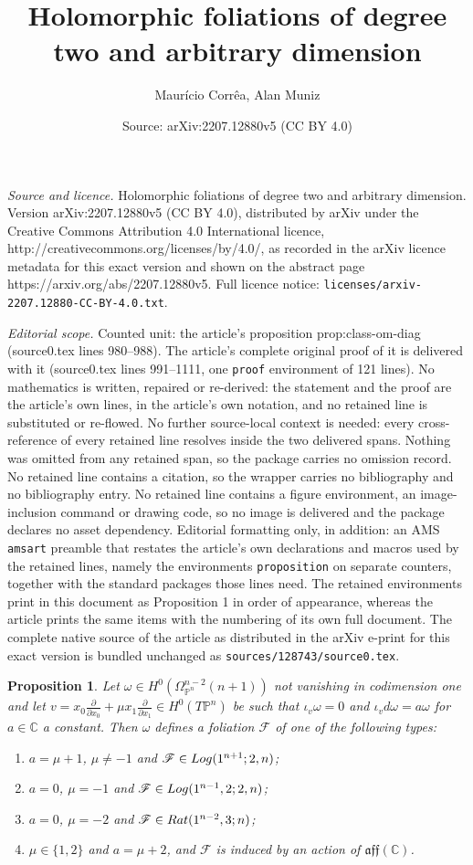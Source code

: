 \documentclass[10pt,a4paper]{amsart}
\title{Holomorphic foliations of degree two and arbitrary dimension}
\author{Maur\'icio Corr\^ea, Alan Muniz}
\date{Source: arXiv:2207.12880v5 (CC BY 4.0)}
\newtheorem{proposition}{Proposition}
\def\CC{{\mathbb{C}}}
\newcommand{\del}[1]{\frac{\partial}{\partial #1}}
\newcommand{\logg}[3]{{\rm Log}(#1;#2,#3)}
\newcommand{\mf}[1]{\mathfrak{#1}}
\newcommand{\pn}{{\mathbb{P}^{n}}}
\newcommand{\rat}[2]{{\rm Rat}(#1;#2)}
\newcommand{\sF}{\mathscr{F}}
\newcommand{\tpn}{T{\mathbb{P}^{n}}}
\begin{document}
\maketitle

\noindent\emph{Source and licence.} Holomorphic foliations of degree two and arbitrary dimension. Version arXiv:2207.12880v5 (CC BY 4.0), distributed by arXiv under the Creative Commons Attribution 4.0 International licence, http://creativecommons.org/licenses/by/4.0/, as recorded in the arXiv licence metadata for this exact version and shown on the abstract page https://arxiv.org/abs/2207.12880v5. Full licence notice: \texttt{licenses/arxiv-2207.12880-CC-BY-4.0.txt}.\par\smallskip

\noindent\textit{Editorial scope.} Counted unit: the article's proposition prop:class-om-diag (source0.tex lines 980--988). The article's complete original proof of it is delivered with it (source0.tex lines 991--1111, one \texttt{proof} environment of 121 lines). No mathematics is written, repaired or re-derived: the statement and the proof are the article's own lines, in the article's own notation, and no retained line is substituted or re-flowed.  No further source-local context is needed: every cross-reference of every retained line resolves inside the two delivered spans.  Nothing was omitted from any retained span, so the package carries no omission record.  No retained line contains a citation, so the wrapper carries no bibliography and no bibliography entry.  No retained line contains a figure environment, an image-inclusion command or drawing code, so no image is delivered and the package declares no asset dependency.  Editorial formatting only, in addition: an AMS \texttt{amsart} preamble that restates the article's own declarations and macros used by the retained lines, namely the environments \texttt{proposition} on separate counters, together with the standard packages those lines need.  The retained environments print in this document as Proposition 1 in order of appearance, whereas the article prints the same items with the numbering of its own full document.  The complete native source of the article as distributed in the arXiv e-print for this exact version is bundled unchanged as \texttt{sources/128743/source0.tex}.
\begin{proposition}\label{prop:class-om-diag}
 Let $\omega\in H^0(\Omega_{\pn}^{n-2}(n+1))$ not vanishing in codimension one and let $v = x_0\del{ x_0} + \mu x_1\del{ x_1}\in H^0(\tpn)$ be such that $\iota_v \omega = 0$ and $\iota_vd\omega = a \omega$ for $a\in\CC$ a constant. Then $\omega$ defines a foliation $\sF$ of one of the following types:
 \begin{enumerate}
 \item $a = \mu + 1$, $\mu \neq -1$ and $\sF \in \logg{1^{n+1}}{2}{n}$;
 \item $a = 0$, $\mu = -1$ and $\sF\in \logg{1^{n-1},2}{2}{n}$;
 \item $a = 0$, $\mu = -2$ and $\sF \in \rat{1^{n-2},3}{n}$;
 \item $\mu \in \{1,2\}$ and $a = \mu + 2$, and $\sF$ is induced by an action of $\mf{aff}(\CC)$.
\end{enumerate}
\end{proposition}
\end{document}
